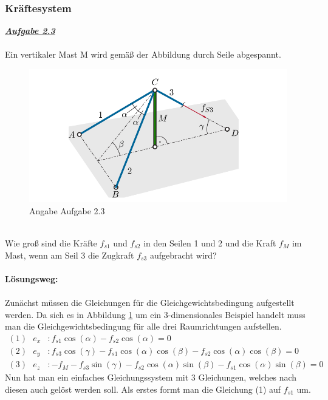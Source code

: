\documentclass[a4paper,12p]{article}
\begin{document}
\subsubsection{Kräftesystem}
\textbf{\textit{\underline{Aufgabe 2.3}}} \\ \\
Ein vertikaler Mast M wird gemäß der Abbildung durch Seile abgespannt.
\begin{figure}[h]
\begin{center}
\includegraphics[width=12.5cm]{pic/Angabe}
\caption{Angabe Aufgabe 2.3}
\label{Angabe}
\end{center}
\end{figure} \\
Wie groß sind die Kräfte $ f_{s1} $ und $ f_{s2} $ in den Seilen 1 und 2 und die Kraft $ f_M $ im Mast, wenn am Seil 3 die Zugkraft $ f_{s3} $ aufgebracht wird? \\ \\
\textbf{Lösungsweg:} \\ \\
Zunächst müssen die Gleichungen für die Gleichgewichtsbedingung aufgestellt werden. Da sich es in Abbildung \ref{Angabe} um ein 3-dimensionales Beispiel handelt muss man die Gleichgewichtsbedingung für alle drei Raumrichtungen aufstellen.
\begin{align*}
	(1) \ \ \ e_x & : f_{s1}\cos(\alpha) - f_{s2}\cos(\alpha) = 0 \\
	(2) \ \ \ e_y & : f_{s3}\cos(\gamma) - f_{s1}\cos(\alpha)\cos(\beta) - f_{s2}\cos(\alpha)\cos(\beta) = 0 \\  
	(3) \ \ \ e_z & : -f_M - f_{s3}\sin(\gamma) - f_{s2}\cos(\alpha)\sin(\beta) - f_{s1}\cos(\alpha)\sin(\beta) = 0
\end{align*}
Nun hat man ein einfaches Gleichungssystem mit 3 Gleichungen, welches nach diesen auch gelöst werden soll. Als erstes formt man die Gleichung (1) auf $f_{s1}$ um. \\ 
\end{document}
